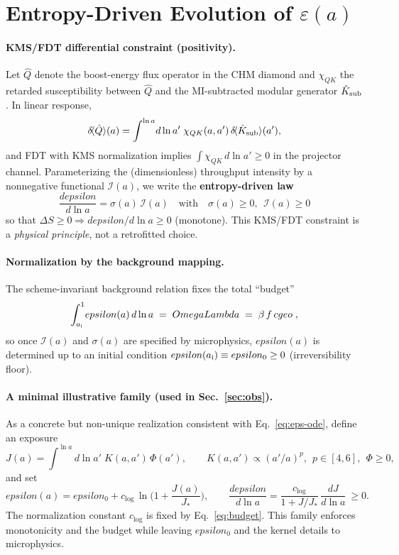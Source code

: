 \documentclass[aps,prd,onecolumn,superscriptaddress,nofootinbib]{revtex4-2}
\def\OmL{OmegaLambda}%
\def\cgeo{cgeo}%
\def\eps{epsilon}%
\def\boxed#1{#1}%
\def\Omega_\Lambda{OmegaLambda}%
\providecommand{\OmL}{\Omega_\Lambda}
\providecommand{\cgeo}{c_{\rm geo}}
\providecommand{\eps}{\varepsilon}
\begin{document}
\section{Entropy-Driven Evolution of \texorpdfstring{$\varepsilon(a)$}{epsilon(a)}}
\label{sec:epsilon}
\paragraph{KMS/FDT differential constraint (positivity).}
Let \(\hat Q\) denote the boost-energy flux operator in the CHM diamond and \(\chi_{QK}\) the retarded susceptibility between \(\hat Q\) and the MI-subtracted modular generator \(\hat K_{\rm sub}\). In linear response,
\[
\delta\!\langle \hat Q\rangle(a) = \int^{\ln a}\! d\ln a' \; \chi_{QK}(a,a')\, \delta\!\langle \hat K_{\rm sub}\rangle(a'),
\]
and FDT with KMS normalization implies \(\int \chi_{QK}\,d\ln a'\ge 0\) in the projector channel. Parameterizing the (dimensionless) throughput intensity by a nonnegative functional \(\mathcal I(a)\), we write the \textbf{entropy-driven law}
\begin{equation}
\label{eq:eps-ode}
\boxed{\;\frac{d\eps}{d\ln a} = \sigma(a)\,\mathcal I(a)\quad\text{with}\quad \sigma(a)\ge 0,\ \ \mathcal I(a)\ge 0\;}
\end{equation}
so that \(\Delta S\ge 0\Rightarrow d\eps/d\ln a\ge 0\) (monotone). This KMS/FDT constraint is a \emph{physical principle}, not a retrofitted choice.

\paragraph{Normalization by the background mapping.}
The scheme-invariant background relation fixes the total ``budget''
\begin{equation}
\label{eq:budget}
\boxed{\;\int_{a_{\rm i}}^{1}\!\eps(a)\, d\ln a \;=\; \OmL \;=\; \beta\, f\,\cgeo\; ,\;}
\end{equation}
so once \(\mathcal I(a)\) and \(\sigma(a)\) are specified by microphysics, \(\eps(a)\) is determined up to an initial condition \(\eps(a_{\rm i})\equiv \eps_0\ge 0\) (irreversibility floor).

\paragraph{A minimal illustrative family (used in Sec.~\ref{sec:obs}).}
As a concrete but non-unique realization consistent with Eq.~\eqref{eq:eps-ode}, define an exposure
\begin{equation}
\label{eq:Jdef}
J(a)=\int^{\ln a}\! d\ln a'\; K(a,a')\, \Phi(a'),\qquad K(a,a')\propto (a'/a)^p,\ \ p\in[4,6],\ \ \Phi\ge 0,
\end{equation}
and set
\begin{equation}
\label{eq:eps-form}
\eps(a)=\eps_0+c_{\log}\,\ln\!\Big(1+\frac{J(a)}{J_*}\Big),\qquad \frac{d\eps}{d\ln a}=\frac{c_{\log}}{1+J/J_*}\,\frac{dJ}{d\ln a}\ \ge 0.
\end{equation}
The normalization constant \(c_{\log}\) is fixed by Eq.~\eqref{eq:budget}. This family enforces monotonicity and the budget while leaving \(\eps_0\) and the kernel details to microphysics.
\end{document}
